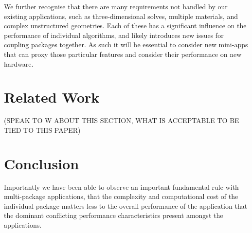 \documentclass[runningheads,a4paper]{llncs}
\begin{document}
We further recognise that there are many requirements not handled by our existing applications, such as three-dimensional solves, multiple materials, and complex unstructured geometries. Each of these has a significant influence on the performance of individual algorithms, and likely introduces new issues for coupling packages together. As such it will be essential to consider new mini-apps that can proxy those particular features and consider their performance on new hardware.

\section{Related Work}

(SPEAK TO W ABOUT THIS SECTION, WHAT IS ACCEPTABLE TO BE TIED TO THIS PAPER)

\section{Conclusion}

Importantly we have been able to observe an important fundamental rule with multi-package applications, that the complexity and computational cost of the individual package matters less to the overall performance of the application that the dominant conflicting performance characteristics present amongst the applications.



\end{document}
